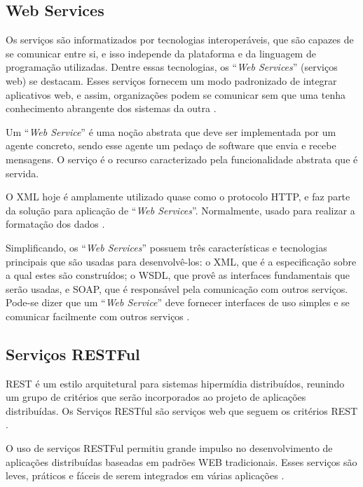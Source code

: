 \begin{apendicesenv}
\subsection{Web Services}

Os serviços são informatizados por tecnologias interoperáveis, que são capazes de se comunicar entre si, e isso independe da plataforma e da linguagem de programação utilizadas. Dentre essas tecnologias, os ``\textit{Web Services}'' (serviços web) se destacam. Esses serviços fornecem um modo padronizado de integrar aplicativos web, e assim, organizações podem se comunicar sem que uma tenha conhecimento abrangente dos sistemas da outra \cite{Victorino:Brascher:2009}.

Um ``\textit{Web Service}'' é uma noção abstrata que deve ser implementada por um agente concreto, sendo esse agente um pedaço de software que envia e recebe mensagens. O serviço é o recurso caracterizado pela funcionalidade abstrata que é servida.

O XML hoje é amplamente utilizado quase como o protocolo HTTP, e faz parte da solução para aplicação de ``\textit{Web Services}''. Normalmente, usado para realizar a formatação dos dados \cite{Alonso:Casati:Kuno:Machiraju:2010}.

Simplificando, os ``\textit{Web Services}'' possuem três características e tecnologias principais que são usadas para desenvolvê-los: o XML, que é a especificação sobre a qual estes são construídos; o WSDL, que provê as interfaces fundamentais que serão usadas, e SOAP, que é responsável pela comunicação com outros serviços. Pode-se dizer que um ``\textit{Web Service}'' deve fornecer interfaces de uso simples e se comunicar facilmente com outros serviços \cite{Newcomer:Lomow:2004}.

\subsection{Serviços RESTFul}

REST é um estilo arquitetural para sistemas hipermídia distribuídos, reunindo um grupo de critérios que serão incorporados ao projeto de aplicações distribuídas. Os Serviços RESTful são serviços web que seguem os critérios REST \cite{Filho:2009}.

O uso de serviços RESTFul permitiu grande impulso no desenvolvimento de aplicações distribuídas baseadas em padrões WEB tradicionais. Esses serviços são leves, práticos e fáceis de serem integrados em várias aplicações \cite{Rosenberg:Curbera:Duftler:Khalaf:2008}.


\end{apendicesenv}
